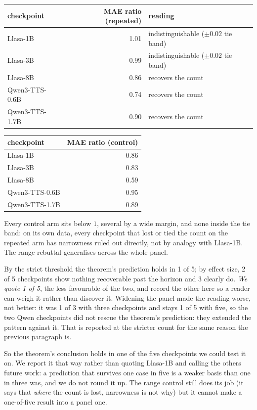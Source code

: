 \documentclass[11pt]{article}
\begin{document}
\begin{center}
\begin{tabular}{lrl}
\toprule
checkpoint & MAE ratio (repeated) & reading \\
\midrule
Llasa-1B       & 1.01 & indistinguishable ($\pm0.02$ tie band) \\
Llasa-3B       & 0.99 & indistinguishable ($\pm0.02$ tie band) \\
Llasa-8B       & 0.86 & recovers the count \\
Qwen3-TTS-0.6B & 0.74 & recovers the count \\
Qwen3-TTS-1.7B & 0.90 & recovers the count \\
\bottomrule
\end{tabular}
\begin{tabular}{lr}
\toprule
checkpoint & MAE ratio (control) \\
\midrule
Llasa-1B       & 0.86 \\
Llasa-3B       & 0.83 \\
Llasa-8B       & 0.59 \\
Qwen3-TTS-0.6B & 0.95 \\
Qwen3-TTS-1.7B & 0.89 \\
\bottomrule
\end{tabular}
\end{center}

\noindent Every control arm sits below $1$, several by a wide margin, and none
inside the tie band: on its own data, every checkpoint that lost or tied the
count on the repeated arm has narrowness ruled out directly, not by analogy with
Llasa-1B. The range rebuttal generalises across the whole panel.

\noindent By the strict threshold the theorem's prediction holds in 1 of 5; by
effect size, 2 of 5 checkpoints show nothing recoverable past the horizon and 3
clearly do. \emph{We quote 1 of 5}, the less favourable of the two, and record
the other here so a reader can weigh it rather than discover it. Widening the
panel made the reading worse, not better: it was 1 of 3 with three checkpoints
and stays 1 of 5 with five, so the two Qwen checkpoints did not rescue the
theorem's prediction: they extended the pattern against it. That is reported
at the stricter count for the same reason the previous paragraph is.

So the theorem's conclusion holds in one of the five checkpoints we could test it
on. We report it that way rather than quoting Llasa-1B and calling the others
future work: a prediction that survives one case in five is a weaker basis than
one in three was, and we do not round it up. The range control still does its
job (it says that \emph{where} the count is lost, narrowness is not why) but
it cannot make a one-of-five result into a panel one.
\end{document}
